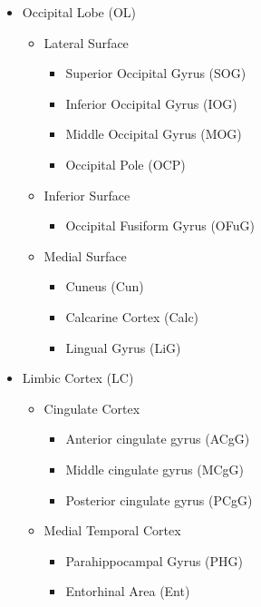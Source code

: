 \begin{itemize}
    \item Occipital Lobe (OL)
        \begin{itemize}
        \item Lateral Surface
            \begin{itemize}
            \item Superior Occipital Gyrus (SOG)
            \item Inferior Occipital Gyrus (IOG)
            \item Middle Occipital Gyrus (MOG)
            \item Occipital Pole (OCP)
            \end{itemize}
        \item Inferior Surface
            \begin{itemize}
            \item Occipital Fusiform Gyrus (OFuG)
            \end{itemize}
        \item Medial Surface
            \begin{itemize}
            \item Cuneus (Cun)
            \item Calcarine Cortex (Calc)
            \item Lingual Gyrus (LiG)
            \end{itemize}
        \end{itemize}
    
    \item Limbic Cortex (LC)
        \begin{itemize}
        \item Cingulate Cortex
            \begin{itemize}
            \item  Anterior cingulate gyrus (ACgG)
            \item Middle cingulate gyrus (MCgG)
            \item Posterior cingulate gyrus (PCgG)
            \end{itemize}
        \item Medial Temporal Cortex
            \begin{itemize}
            \item Parahippocampal Gyrus (PHG)
            \item Entorhinal Area (Ent)
            \end{itemize}
        \end{itemize}
    
\end{itemize}


